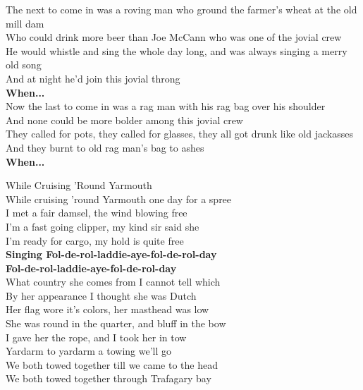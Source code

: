 \documentclass[letterpaper,9pt]{article}
\begin{document}
The next to come in was a roving man who ground the farmer's wheat at the old mill dam \\
Who could drink more beer than Joe McCann who was one of the jovial crew \\
He would whistle and sing the whole day long, and was always singing a merry old song \\
And at night he'd join this jovial throng \\
\textbf{When...} \\

Now the last to come in was a rag man with his rag bag over his shoulder \\
And none could be more bolder among this jovial crew \\
They called for pots, they called for glasses, they all got drunk like old jackasses \\
And they burnt to old rag man's bag to ashes \\
\textbf{When...} \\

\newpage
{}
\Huge
While Cruising 'Round Yarmouth\\

\Large
While cruising 'round Yarmouth one day for a spree \\
I met a fair damsel, the wind blowing free \\
I'm a fast going clipper, my kind sir said she \\
I'm ready for cargo, my hold is quite free \\
\textbf{Singing Fol-de-rol-laddie-aye-fol-de-rol-day \\
Fol-de-rol-laddie-aye-fol-de-rol-day} \\

What country she comes from I cannot tell which \\
By her appearance I thought she was Dutch \\
Her flag wore it's colors, her masthead was low \\
She was round in the quarter, and bluff in the bow \\

I gave her the rope, and I took her in tow \\
Yardarm to yardarm a towing we'll go \\
We both towed together till we came to the head \\
We both towed together through Trafagary bay \\
\end{document}
